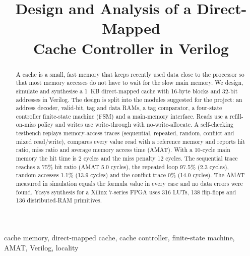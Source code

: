 \documentclass[conference]{IEEEtran}
\begin{document}
\title{Design and Analysis of a Direct-Mapped\\Cache Controller in Verilog}

\author{
}

\maketitle

\begin{abstract}
A cache is a small, fast memory that keeps recently used data close to the processor so that most memory
accesses do not have to wait for the slow main memory. We design, simulate and synthesise a 1~KB
direct-mapped cache with 16-byte blocks and 32-bit addresses in Verilog. The design is split into the modules
suggested for the project: an address decoder, valid-bit, tag and data RAMs, a tag comparator, a four-state
controller finite-state machine (FSM) and a main-memory interface. Reads use a refill-on-miss policy and writes use
write-through with no-write-allocate. A self-checking testbench replays memory-access traces (sequential, repeated,
random, conflict and mixed read/write), compares every value read with a reference memory and reports hit ratio,
miss ratio and average memory access time (AMAT). With a 10-cycle main memory the hit time is 2 cycles and the
miss penalty 12 cycles. The sequential trace reaches a 75\% hit ratio (AMAT 5.0 cycles), the repeated loop 97.5\%
(2.3 cycles), random accesses 1.1\% (13.9 cycles) and the conflict trace 0\% (14.0 cycles). The AMAT measured in
simulation equals the formula value in every case and no data errors were found. Yosys synthesis for a Xilinx
7-series FPGA uses 316 LUTs, 138 flip-flops and 136 distributed-RAM primitives.
\end{abstract}

\begin{IEEEkeywords}
cache memory, direct-mapped cache, cache controller, finite-state machine, AMAT, Verilog, locality
\end{IEEEkeywords}

\end{document}
